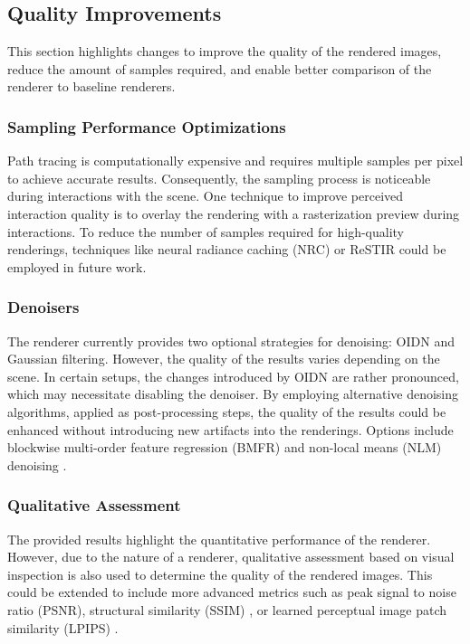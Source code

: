 \subsection*{Quality Improvements}

This section highlights changes to improve the quality of the rendered images, reduce the amount of samples required, and enable better comparison of the renderer to baseline renderers.

\subsubsection*{Sampling Performance Optimizations}

Path tracing is computationally expensive and requires multiple samples per pixel to achieve accurate results. Consequently, the sampling process is noticeable during interactions with the scene. One technique to improve perceived interaction quality is to overlay the rendering with a rasterization preview during interactions. To reduce the number of samples required for high-quality renderings, techniques like neural radiance caching (NRC) \cite{muller2021real} or \gls{ReSTIR} \cite{restir} could be employed in future work.

\subsubsection*{Denoisers}

The renderer currently provides two optional strategies for denoising: \gls{OIDN} \cite{openImageDenoise} and Gaussian filtering. However, the quality of the results varies depending on the scene. In certain setups, the changes introduced by \gls{OIDN} are rather pronounced, which may necessitate disabling the denoiser. By employing alternative denoising algorithms, applied as post-processing steps, the quality of the results could be enhanced without introducing new artifacts into the renderings. Options include blockwise multi-order feature regression (BMFR) \cite{blockwise-multi-order-regresssion-for-rt-pt} and non-local means (NLM) denoising \cite{buadesNLMDenoising}.

\subsubsection*{Qualitative Assessment}

The provided results highlight the quantitative performance of the renderer. However, due to the nature of a renderer, qualitative assessment based on visual inspection is also used to determine the quality of the rendered images. This could be extended to include more advanced metrics such as peak signal to noise ratio (PSNR), structural similarity (SSIM) \cite{ssim}, or learned perceptual image patch similarity (LPIPS) \cite{lpips}.

